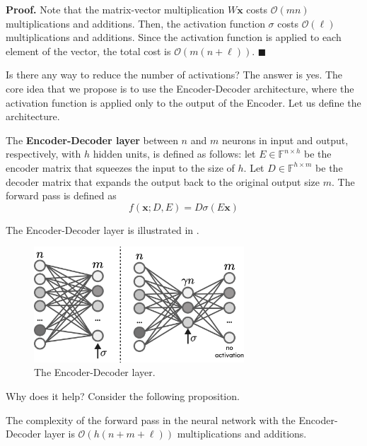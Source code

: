 \documentclass{iacrtrans}
\begin{document}
\textbf{Proof.} Note that the matrix-vector multiplication $W\mathbf{x}$ costs
$\mathcal{O}(mn)$ multiplications and additions. Then, the activation function
$\sigma$ costs $\mathcal{O}(\ell)$ multiplications and additions.
Since the activation function is applied to each element of the vector, the total
cost is $\mathcal{O}(m(n+\ell))$. $\blacksquare$

Is there any way to reduce the number of activations? The answer is yes. The 
core idea that we propose is to use the Encoder-Decoder architecture, where the
activation function is applied only to the output of the Encoder. Let us 
define the architecture.
\begin{definition}
    The \textbf{Encoder-Decoder layer} between $n$ and $m$ neurons in input and
    output, respectively, with $h$ hidden units, is defined as follows: let
    $E \in \mathbb{F}^{n \times h}$ be the encoder matrix that squeezes the
    input to the size of $h$. Let $D \in \mathbb{F}^{h \times m}$ be the decoder
    matrix that expands the output back to the original output size $m$. The
    forward pass is defined as 
    \begin{equation*}
        f(\mathbf{x}; D,E) = D\sigma(E\mathbf{x})
    \end{equation*}

    The Encoder-Decoder layer is illustrated in .
\end{definition}

\begin{figure}
    \centering
    \includegraphics[width=0.7\textwidth]{figures/ed.pdf}
    \caption{The Encoder-Decoder layer.}
    \label{figure:encoder-decoder}
\end{figure}

Why does it help? Consider the following proposition.
\begin{proposition}
    The complexity of the forward pass in the neural network with the
    Encoder-Decoder layer is $\mathcal{O}(h(n + m + \ell))$ multiplications and additions.
\end{proposition}
\end{document}

